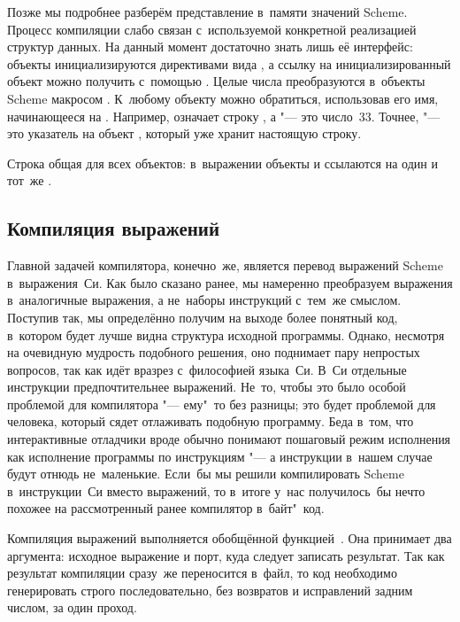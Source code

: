 Позже  мы подробнее разберём представление в~памяти
значений Scheme. Процесс компиляции слабо связан с~используемой конкретной
реализацией структур данных. На данный момент достаточно знать лишь её
интерфейс: объекты инициализируются директивами вида , а
ссылку на инициализированный объект можно получить с~помощью .
Целые числа преобразуются в~объекты Scheme макросом .
К~любому объекту можно обратиться, использовав его имя, начинающееся на
. Например,  означает строку , а  "---
это число~33. Точнее,  "--- это указатель на объект
, который уже хранит настоящую строку.

Строка  общая для всех объектов: в~выражении 
объекты  и  ссылаются на один и тот~же
.


\subsection{Компиляция выражений}\label{cc/gen/ssect:exprs}

Главной задачей компилятора, конечно~же, является перевод выражений Scheme
в~выражения~Си. Как было сказано ранее, мы намеренно преобразуем выражения
в~аналогичные выражения, а не~наборы инструкций с~тем~же смыслом. Поступив так,
мы определённо получим на выходе более понятный код, в~котором будет лучше видна
структура исходной программы. Однако, несмотря на очевидную мудрость подобного
решения, оно поднимает пару непростых вопросов, так как идёт вразрез
с~философией языка~Си. В~Си отдельные инструкции предпочтительнее выражений.
Не~то, чтобы это было особой проблемой для компилятора "--- ему"~то без разницы;
это будет проблемой для человека, который сядет отлаживать подобную программу.
Беда в~том, что интерактивные отладчики вроде  обычно понимают пошаговый
режим исполнения как исполнение программы по инструкциям "--- а инструкции
в~нашем случае будут отнюдь не~маленькие. Если~бы мы решили компилировать Scheme
в~инструкции~Си вместо выражений, то в~итоге у~нас получилось~бы нечто похожее
на рассмотренный ранее компилятор в~байт"~код. 

Компиляция выражений выполняется обобщённой функцией~. Она принимает
два аргумента: исходное выражение и порт, куда следует записать результат. Так
как результат компиляции сразу~же переносится в~файл, то код необходимо
генерировать строго последовательно, без возвратов и исправлений задним числом,
за один проход.

